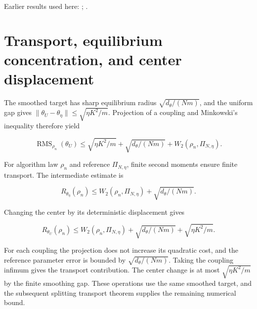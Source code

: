 \documentclass[11pt,a4paper]{article}
\begin{document}
Earlier results used here: \cite[Section~3.1.1]{LangevinLean2026IPLA}; \cite[Section~3.1.6]{LangevinLean2026IPLA}.

\section{\texorpdfstring{Transport, equilibrium concentration, and center displacement}{Transport, equilibrium concentration, and center displacement}}


The smoothed target has sharp equilibrium radius \(\sqrt{d_\theta/(Nm)}\), and the uniform gap gives \(\|\theta_U-\theta_\eta\|\le\sqrt{\eta K^2/m}\). Projection of a coupling and Minkowski’s inequality therefore yield

\[\operatorname{RMS}_{\rho_n}(\theta_U)\le\sqrt{\eta K^2/m}+\sqrt{d_\theta/(Nm)}+W_2(\rho_n,\Pi_{N,\eta}).\]

For algorithm law \(\rho_n\) and reference \(\Pi_{N,\eta}\), finite second moments ensure finite transport. The intermediate estimate is

\[R_{\theta_\eta}(\rho_n)\le W_2(\rho_n,\Pi_{N,\eta})+\sqrt{d_\theta/(Nm)}.\]

Changing the center by its deterministic displacement gives

\[R_{\theta_U}(\rho_n)\le W_2(\rho_n,\Pi_{N,\eta})+\sqrt{d_\theta/(Nm)}+\sqrt{\eta K^2/m}.\]

For each coupling the projection does not increase its quadratic cost, and the reference parameter error is bounded by \(\sqrt{d_\theta/(Nm)}\). Taking the coupling infimum gives the transport contribution. The center change is at most \(\sqrt{\eta K^2/m}\) by the finite smoothing gap. These operations use the same smoothed target, and the subsequent splitting transport theorem supplies the remaining numerical bound.
\end{document}
